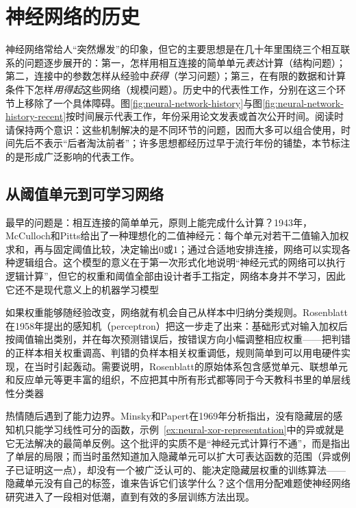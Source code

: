 \FloatBarrier

\section{神经网络的历史}
\label{sec:neural-history}

神经网络常给人“突然爆发”的印象，但它的主要思想是在几十年里围绕三个相互联系的问题逐步展开的：第一，怎样用相互连接的简单单元\emph{表达}计算（结构问题）；第二，连接中的参数怎样从经验中\emph{获得}（学习问题）；第三，在有限的数据和计算条件下怎样\emph{用得起}这些网络（规模问题）。历史中的代表性工作，分别在这三个环节上移除了一个具体障碍。图\ref{fig:neural-network-history}与图\ref{fig:neural-network-history-recent}按时间展示代表工作，年份采用论文发表或首次公开时间。阅读时请保持两个意识：这些机制解决的是不同环节的问题，因而大多可以组合使用，时间先后不表示“后者淘汰前者”；许多思想都经历过早于流行年份的铺垫，本节标注的是形成广泛影响的代表工作。

\subsection{从阈值单元到可学习网络}
\label{sec:neural-history-threshold}

最早的问题是：相互连接的简单单元，原则上能完成什么计算？1943年，McCulloch和Pitts给出了一种理想化的二值神经元：每个单元对若干二值输入加权求和，再与固定阈值比较，决定输出$0$或$1$；通过合适地安排连接，网络可以实现各种逻辑组合。这个模型的意义在于第一次形式化地说明“神经元式的网络可以执行逻辑计算”，但它的权重和阈值全部由设计者手工指定，网络本身并不学习，因此它还不是现代意义上的机器学习模型

如果权重能够随经验改变，网络就有机会自己从样本中归纳分类规则。Rosenblatt在1958年提出的感知机（perceptron）把这一步走了出来：基础形式对输入加权后按阈值输出类别，并在每次预测错误后，按错误方向小幅调整相应权重——把判错的正样本相关权重调高、判错的负样本相关权重调低，规则简单到可以用电硬件实现，在当时引起轰动。需要说明，Rosenblatt的原始体系包含感觉单元、联想单元和反应单元等更丰富的组织，不应把其中所有形式都等同于今天教科书里的单层线性分类器

热情随后遇到了能力边界。Minsky和Papert在1969年分析指出，没有隐藏层的感知机只能学习线性可分的函数，示例~\ref{ex:neural-xor-representation}中的异或就是它无法解决的最简单反例。这个批评的实质不是“神经元式计算行不通”，而是指出了单层的局限；而当时虽然知道加入隐藏单元可以扩大可表达函数的范围（异或例子已证明这一点），却没有一个被广泛认可的、能决定隐藏层权重的训练算法——隐藏单元没有自己的标签，谁来告诉它们该学什么？这个信用分配难题使神经网络研究进入了一段相对低潮，直到有效的多层训练方法出现。

